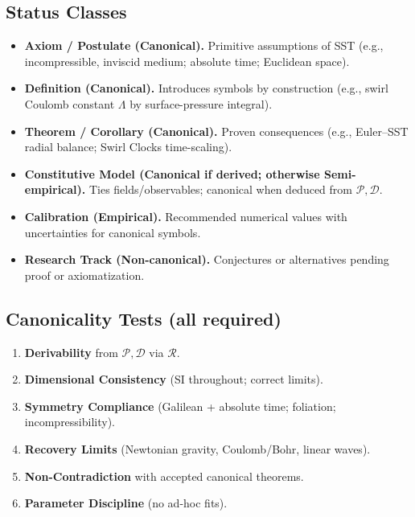 \documentclass[11pt, a4paper]{article}
\begin{document}
    \subsection*{Status Classes}
    \begin{itemize}
        \item \textbf{Axiom / Postulate (Canonical).} Primitive assumptions of SST (e.g., incompressible, inviscid medium; absolute time; Euclidean space).
        \item \textbf{Definition (Canonical).} Introduces symbols by construction (e.g., swirl Coulomb constant \(\Lambda\) by surface-pressure integral).
        \item \textbf{Theorem / Corollary (Canonical).} Proven consequences (e.g., Euler–SST radial balance; Swirl Clocks time-scaling).
        \item \textbf{Constitutive Model (Canonical if derived; otherwise Semi-empirical).} Ties fields/observables; canonical when deduced from \(\mathcal{P},\mathcal{D}\).
        \item \textbf{Calibration (Empirical).} Recommended numerical values with uncertainties for canonical symbols.
        \item \textbf{Research Track (Non-canonical).} Conjectures or alternatives pending proof or axiomatization.
    \end{itemize}

    \subsection*{Canonicality Tests (all required)}
    \begin{enumerate}
        \item \textbf{Derivability} from \(\mathcal{P},\mathcal{D}\) via \(\mathcal{R}\).
        \item \textbf{Dimensional Consistency} (SI throughout; correct limits).
        \item \textbf{Symmetry Compliance} (Galilean + absolute time; foliation; incompressibility).
        \item \textbf{Recovery Limits} (Newtonian gravity, Coulomb/Bohr, linear waves).
        \item \textbf{Non-Contradiction} with accepted canonical theorems.
        \item \textbf{Parameter Discipline} (no ad-hoc fits).
    \end{enumerate}
\end{document}
